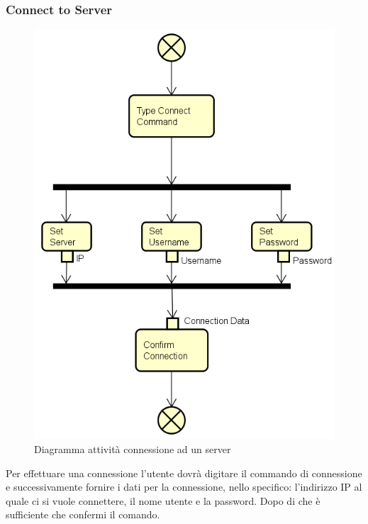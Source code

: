 \documentclass[a4paper]{article}
\begin{document}
		\subsubsection{Connect to Server}
			\begin{figure} [H]
				\centering
				\includegraphics[scale=0.6]{ST/client/diagramma-Connect-to-Server.png}
				\caption{Diagramma attività connessione ad un server}
			\end{figure}
				Per effettuare una connessione l'utente dovrà digitare il commando di connessione e successivamente fornire i dati per la connessione, nello specifico: l'indirizzo IP al quale ci si vuole connettere, il nome utente e la password. Dopo di che è sufficiente che confermi il comando.
\end{document}
